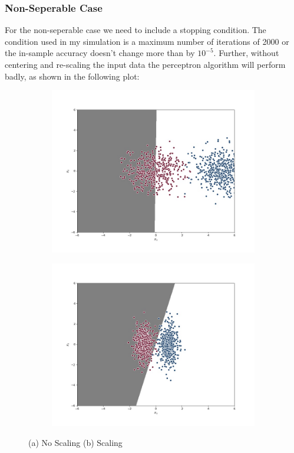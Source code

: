 \documentclass[a4paper, 11pt]{article} %
\begin{document}
\subsubsection*{Non-Seperable Case}

For the non-seperable case we need to include a stopping condition. The condition used in my simulation is a maximum number of iterations of 2000 or the in-sample accuracy doesn't change more than by $10^{-5}$. Further, without centering and re-scaling the input data the perceptron algorithm will perform badly, as shown in the following plot:

\begin{figure}[htp]
    \centering
    \begin{subfigure}{0.5\textwidth}
      \centering
      \includegraphics[scale= 0.25]{R2_Convergence/Perceptron_NOSCALE_round_32}
      \caption{}
    \end{subfigure}%
    \begin{subfigure}{0.5\textwidth}
      \centering
      \includegraphics[scale= 0.25]{R2_Convergence/Perceptron_SCALE_round_30}
      \caption{}
    \end{subfigure}
  \caption { (a) No Scaling (b) Scaling}
\end{figure}
\end{document}
